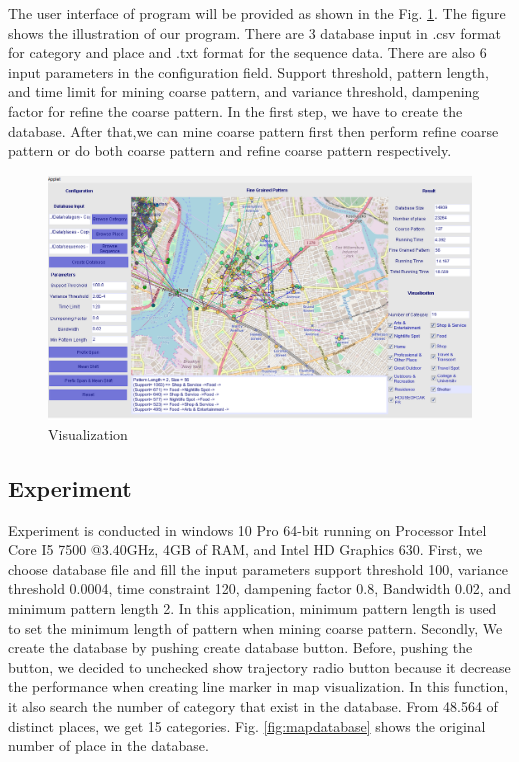 \documentclass[conference]{IEEEtran}
\begin{document}
The user interface of program will be provided as shown in the Fig. \ref{fig:visual}. The figure shows the illustration of our program. There are 3 database input in .csv format for category and place and .txt format for the sequence data. There are also 6 input parameters in the configuration field. Support threshold, pattern length, and time limit for mining coarse pattern, and variance threshold, dampening factor for refine the coarse pattern. In the first step, we have to create the database. After that,we can mine coarse pattern first then perform refine coarse pattern or do both coarse pattern and refine coarse pattern respectively.
\begin{figure}[!h]
	\centering
	\includegraphics[width=1\linewidth]{visual}
	\caption{Visualization}
	\label{fig:visual}
\end{figure}

\subsection{Experiment}
Experiment is conducted in windows 10 Pro 64-bit running on Processor Intel Core I5 7500 @3.40GHz, 4GB of RAM, and Intel HD Graphics 630. First, we choose database file and fill the input parameters support threshold 100, variance threshold 0.0004, time constraint 120, dampening factor 0.8, Bandwidth 0.02, and minimum pattern length 2. In this application, minimum pattern length is used to set the minimum length of pattern when mining coarse pattern. Secondly, We create the database by pushing create database button. Before, pushing the button, we decided to unchecked show trajectory radio button because it decrease the performance when creating line marker in map visualization. In this function, it also search the number of category that exist in the database. From 48.564 of distinct places, we get 15 categories. Fig. \ref{fig:mapdatabase} shows the original number of place in the database.   
\end{document}
